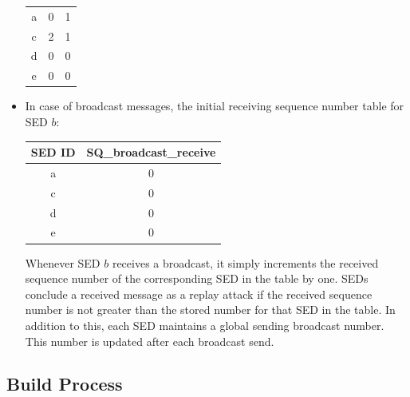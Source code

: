 \documentclass[11pt,oneside,onecolumn,letterpaper]{article}
\begin{document}
\begin{itemize}
\begin{center}
\begin{tabular}{ |c|c|c| }
 	\hline \hline
 	a & 0 & 1 \\ 
	c & 2 & 1 \\ 
 	d & 0 & 0 \\ 
 	e & 0 & 0 \\ 
	 \hline
\end{tabular}
\end{center}
\item In case of broadcast messages, the initial receiving sequence number table for SED $b$:
   \begin{center}
  \begin{tabular}{ |c|c| } 
    \hline
  \textbf{SED ID} & \textbf{SQ\_broadcast\_receive}\\
 	\hline \hline
 	a & 0\\ 
	c & 0 \\ 
 	d & 0 \\ 
 	e & 0 \\ 
	 \hline
\end{tabular}
\end{center}
Whenever SED $b$ receives a broadcast, it simply increments the received sequence number of the corresponding SED in the table by one. SEDs conclude a received message as a replay attack if the received sequence number is not greater than the stored number for that SED in the table.
In addition to this, each SED maintains a global sending broadcast number. This number is updated after each broadcast send.
    \end{itemize}


\subsection{Build Process}
\end{document}
